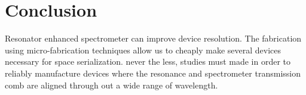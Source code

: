 \documentclass[12pt,twoside,english]{book}
\renewcommand{\~}{\perispomeni}%
\providecommand{\tabularnewline}{\\}
\numberwithin{equation}{section}
\numberwithin{figure}{section}
\begin{document}
\section{Conclusion}
Resonator enhanced spectrometer can improve device resolution. The fabrication using micro-fabrication techniques allow us to cheaply make several devices necessary for space serialization. never the less, studies must made in order to reliably manufacture devices where the resonance and spectrometer transmission comb are aligned through out a wide range of wavelength.

\printbibliography
{}
\appendix
%
%
%
%
\end{document}
